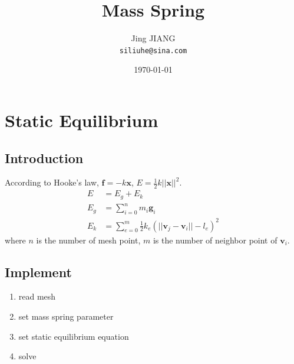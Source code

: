 \documentclass{article}
\title{Mass Spring} %
\author{Jing JIANG\\ \texttt{siliuhe@sina.com}} %
\date{%
  \today} %
\begin{document}
\maketitle %

\section*{Static Equilibrium}
\subsection*{Introduction} %

According to Hooke's law, $\bm{f} = -k\bm{x}$, $E=\frac{1}{2}k{||\bm{x}||}^2$.
\begin{equation*}
  \begin{split}
    E&=E_g+E_k  \\
    E_g&=\sum_{i=0}^{n}m_i\bm{g}_i  \\
    E_k&=\sum_{e=0}^{m}\frac{1}{2}k_e({||\bm{v}_j-\bm{v}_i||-l_e})^2
  \end{split}
\end{equation*}
where $n$ is the number of mesh point, $m$ is the number of neighbor point of $\bm{v}_i$.
\subsection*{Implement}
\begin{enumerate}
\item read mesh
\item set mass spring parameter
\item set static equilibrium equation
\item solve
\end{enumerate}
\end{document}

